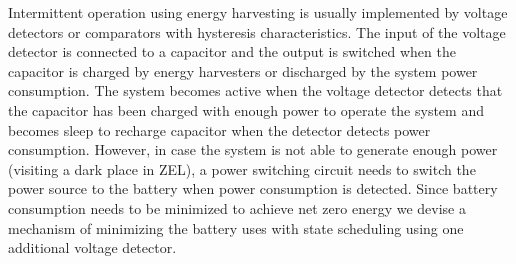 \documentclass[conference]{IEEEtran}
\begin{document}

Intermittent operation using energy harvesting is usually implemented by voltage detectors or comparators with hysteresis characteristics\cite{electronics8121446,Chen2017BatteryfreePM}.
The input of the voltage detector is connected to a capacitor and the output is switched when the capacitor is charged by energy harvesters or discharged by the system power consumption.
The system becomes active when the voltage detector detects that the capacitor has been charged with enough power to operate the system and becomes sleep to recharge capacitor when the detector detects power consumption.
However, in case the system is not able to generate enough power (visiting a dark place in ZEL), a power switching circuit needs to switch the power source to the battery when power consumption is detected.
Since battery consumption needs to be minimized to achieve net zero energy we devise a mechanism of minimizing the battery uses with state scheduling using one additional voltage detector.
\end{document}
